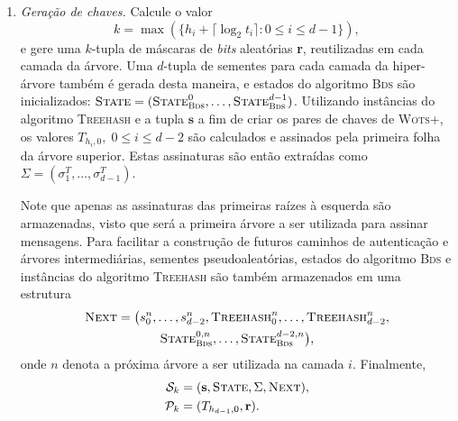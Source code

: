 \documentclass{ufsctex/ufsctex}
\newcommand{\pk}{\mathcal{P}_k}
\newcommand{\sk}{\mathcal{S}_k}
\newcommand{\bds}{\textsc{Bds}}
\newcommand{\wotsplus}{\textsc{Wots+}}
\begin{document}
\begin{enumerate}

  \item[] \emph{Geração de chaves.} Calcule o valor
      \begin{equation}
        k = \max(\{h_i + \lceil \log_2 t_i \rceil : 0 \leq i \leq d - 1\}),
      \end{equation}
        e gere uma $k$-tupla de máscaras de \emph{bits} aleatórias \textbf{r},
        reutilizadas em cada camada da árvore. Uma $d$-tupla de sementes para
        cada camada da hiper-árvore também é gerada desta maneira, e
        estados do algoritmo \bds{} são inicializados: $\textsc{State} =
        (\textsc{State}_{\bds{}}^{0}, \dots, \textsc{State}_{\bds{}}^{d - 1})$.
        Utilizando instâncias do algoritmo \textsc{Treehash} e a tupla
        $\textbf{s}$ a fim de criar os pares de chaves de \wotsplus{}, os
        valores $T_{h_{i}, 0}, \; 0 \leq i \leq d - 2$ são calculados e
        assinados pela primeira folha da árvore superior. Estas assinaturas são
        então extraídas como $\Sigma = (\sigma_{1}^{T}, \dots, \sigma_{d -
        1}^{T})$.

        Note que apenas as assinaturas das primeiras raízes à esquerda são
        armazenadas, visto que será a primeira árvore a ser utilizada para
        assinar mensagens. Para facilitar a construção de futuros caminhos de
        autenticação e árvores intermediárias, sementes pseudoaleatórias,
        estados do algoritmo \bds{} e instâncias do algoritmo \textsc{Treehash}
        são também armazenados em uma estrutura
        \begin{multline}
          \textsc{Next} = \big(s^{n}_{0}, \dots, s^{n}_{d - 2},
            \textsc{Treehash}^{n}_{0}, \dots, \textsc{Treehash}^{n}_{d - 2}, \\
            \textsc{State}_{\bds{}}^{0, n},
            \dots, \textsc{State}_{\bds{}}^{d - 2, n}\big),
        \end{multline}
        onde $n$ denota a próxima árvore a ser utilizada na camada $i$.
        Finalmente,
        \begin{align}
          \sk{} &= (\textbf{s}, \textsc{State}, \Sigma, \textsc{Next}), \\
          \pk{} &= (T_{h_{d - 1}, 0}, \mathbf{r}).
        \end{align}


\end{enumerate}
\end{document}
